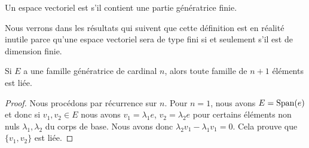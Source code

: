 \begin{definition}
    Un espace vectoriel est  s'il contient une partie génératrice finie.
\end{definition}
Nous verrons dans les résultats qui suivent que cette définition est en réalité inutile parce qu'une espace vectoriel sera de type fini si et seulement s'il est de dimension finie.

\begin{lemma}       \label{LemytHnlD}
    Si \( E\) a une famille génératrice de cardinal \( n\), alors toute famille de \( n+1\) éléments est liée.
\end{lemma}

\begin{proof}
    Nous procédons par récurrence sur \( n\). Pour \( n=1\), nous avons \( E=\operatorname{Span}(e)\) et donc si \( v_1,v_2\in E\) nous avons \( v_1=\lambda_1 e\), \( v_2=\lambda_2e\) pour certains éléments non nuls \( \lambda_1,\lambda_2\) du corps de base. Nous avons donc \( \lambda_2v_1-\lambda_1v_1=0\). Cela prouve que \( \{ v_1,v_2 \}\) est liée.


\end{proof}
